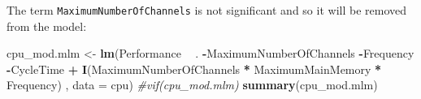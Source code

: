 \documentclass[12pt]{article}
\newenvironment{Shaded}{\begin{snugshade}}{\end{snugshade}}
\newcommand{\CommentTok}[1]{\textcolor[rgb]{0.56,0.35,0.01}{\textit{#1}}}
\newcommand{\DataTypeTok}[1]{\textcolor[rgb]{0.13,0.29,0.53}{#1}}
\newcommand{\KeywordTok}[1]{\textcolor[rgb]{0.13,0.29,0.53}{\textbf{#1}}}
\newcommand{\NormalTok}[1]{#1}
\newcommand{\OperatorTok}[1]{\textcolor[rgb]{0.81,0.36,0.00}{\textbf{#1}}}
\newcommand{\StringTok}[1]{\textcolor[rgb]{0.31,0.60,0.02}{#1}}
\begin{document}
The term \texttt{MaximumNumberOfChannels} is not significant and so it
will be removed from the model:

\begin{Shaded}
\begin{Highlighting}[]
\NormalTok{cpu_mod.mlm <-}\StringTok{ }\KeywordTok{lm}\NormalTok{(Performance }\OperatorTok{~}\StringTok{ }\NormalTok{. }\OperatorTok{-}\NormalTok{MaximumNumberOfChannels }\OperatorTok{-}\NormalTok{Frequency }\OperatorTok{-}\NormalTok{CycleTime }\OperatorTok{+}\StringTok{ }\KeywordTok{I}\NormalTok{(MaximumNumberOfChannels }\OperatorTok{*}\StringTok{ }\NormalTok{MaximumMainMemory }\OperatorTok{*}\StringTok{ }\NormalTok{Frequency)  , }\DataTypeTok{data =}\NormalTok{ cpu) }
\CommentTok{#vif(cpu_mod.mlm)}
 \KeywordTok{summary}\NormalTok{(cpu_mod.mlm)}
\end{Highlighting}
\end{Shaded}
\end{document}
